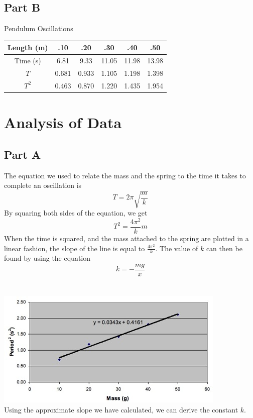 \documentclass[titlepage]{article}
\begin{document}
\subsection{Part B}\label{sub:part_b}

Pendulum Oscillations
\begin{tabular}{cccccc}
\hline
Length (m) & .10 & .20 & .30 & .40 & .50\\
\hline
Time (s) & 6.81 & 9.33 & 11.05 & 11.98 & 13.98\\
\hline
$T$ & 0.681 & 0.933 & 1.105 & 1.198 & 1.398\\
\hline
$T^2$ & 0.463 & 0.870 & 1.220 & 1.435 & 1.954\\
\hline
\end{tabular}


\section{Analysis of Data}\label{sec:analysis_of_data}

\subsection{Part A}\label{sub:part_a}
The equation we used to relate the mass and the spring to the time it takes to complete an oscillation is
\begin{equation}
	T = 2 \pi \sqrt{\frac{m}{k}}
\end{equation}
By squaring both sides of the equation, we get
\begin{equation}
	T^2 = \frac{4 \pi^2}{k} m
\end{equation}
When the time is squared, and the mass attached to the spring are plotted in a linear fashion, the slope of the line is equal to $\frac{4 \pi^2}{k}$. The value of $k$ can then be found by using the equation
\begin{equation}
	k = -\frac{mg}{x}
\end{equation}
\\
\\
\includegraphics{graphA.jpg}
\\
Using the approximate slope we have calculated, we can derive the constant $k$.
\end{document}
